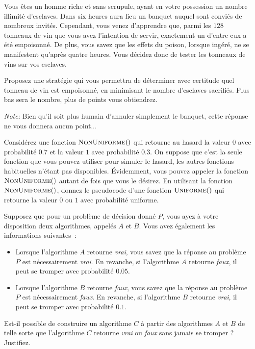 \documentclass[12pt,addpoints]{exam}
\begin{document}
\begin{questions}
\question
Vous êtes un homme riche et sans scrupule, ayant en votre possession un nombre illimité d'esclaves. Dans six heures aura lieu un banquet auquel sont conviés de nombreux invités. Cependant, vous venez d'apprendre que, parmi les $128$ tonneaux de vin que vous avez l'intention de servir, exactement un d'entre eux a été empoisonné. De plus, vous savez que les effets du poison, lorsque ingéré, ne se manifestent qu'après quatre heures. Vous décidez donc de tester les tonneaux de vins sur vos esclaves.

Proposez une stratégie qui vous permettra de déterminer avec certitude quel tonneau de vin est empoisonné, en minimisant le nombre d'esclaves sacrifiés. Plus bas sera le nombre, plus de points vous obtiendrez.

\emph{Note:} Bien qu'il soit plus humain d'annuler simplement le banquet, cette réponse ne vous donnera aucun point...


\question
Considérez une fonction $\Call{NonUniforme}$ qui retourne au hasard la valeur $0$ avec probabilité $0.7$ et la valeur $1$ avec probabilité $0.3$. On suppose que c'est la seule fonction que vous pouvez utiliser pour simuler le hasard, les autres fonctions habituelles n'étant pas disponibles. Évidemment, vous pouvez appeler la fonction $\Call{NonUniforme}$ autant de fois que vous le désirez. En utilisant la fonction $\Call{NonUniforme}$, donnez le pseudocode d'une fonction $\Call{Uniforme}$ qui retourne la valeur $0$ ou $1$ avec probabilité uniforme.
\begin{solution}
\end{solution}

\question
Supposez que pour un problème de décision donné $P$, vous ayez à votre disposition deux algorithmes, appelés $A$ et $B$. Vous avez également les informations suivantes~:
\begin{itemize}
  \item Lorsque l'algorithme $A$ retourne \emph{vrai}, vous savez que la réponse au problème $P$ est nécessairement \emph{vrai}. En revanche, si l'algorithme $A$ retourne \emph{faux}, il peut se tromper avec probabilité $0.05$.
  \item Lorsque l'algorithme $B$ retourne \emph{faux}, vous savez que la réponse au problème $P$ est nécessairement \emph{faux}. En revanche, si l'algorithme $B$ retourne \emph{vrai}, il peut se tromper avec probabilité $0.1$.
\end{itemize}
Est-il possible de construire un algorithme $C$ à partir des algorithmes $A$ et $B$ de telle sorte que l'algorithme $C$ retourne \emph{vrai} ou \emph{faux} sans jamais se tromper ? Justifiez.


\end{questions}
\end{document}
